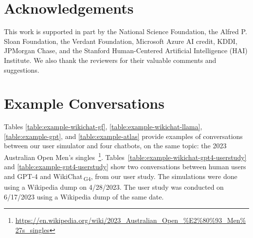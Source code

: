 \documentclass[11pt]{article}
\newcommand{\systemgf}[0]{WikiChat$\,$\textsubscript{G4}\xspace}
\begin{document}



\section*{Acknowledgements}
This work is supported in part by the National Science Foundation, the Alfred P. Sloan Foundation, the Verdant Foundation, Microsoft Azure AI credit, KDDI, JPMorgan Chase, and the Stanford Human-Centered Artificial Intelligence (HAI) Institute. We also thank the reviewers for their valuable comments and suggestions. 




\appendix

\section{Example Conversations}
\label{sec:example-dialogs}
Tables \ref{table:example-wikichat-gf}, \ref{table:example-wikichat-llama}, \ref{table:example-gpt}, and \ref{table:example-atlas} provide examples of conversations between our user simulator and four chatbots, on the same topic: the 2023 Australian Open Men's singles~\footnote{\url{https://en.wikipedia.org/wiki/2023_Australian_Open_\%E2\%80\%93_Men\%27s_singles}}.
Tables~\ref{table:example-wikichat-gpt4-userstudy} and \ref{table:example-gpt4-userstudy} show two conversations between human users and GPT-4 and \systemgf, from our user study.
The simulations were done using a Wikipedia dump on 4/28/2023.
The user study was conducted on 6/17/2023 using a Wikipedia dump of the same date.
\end{document}
